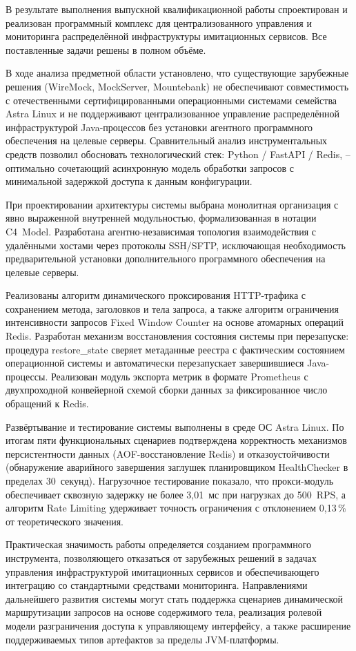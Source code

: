 ﻿\Conclusion %

В результате выполнения выпускной квалификационной работы спроектирован и реализован программный комплекс для централизованного управления и мониторинга распределённой инфраструктуры имитационных сервисов. Все поставленные задачи решены в полном объёме.

В ходе анализа предметной области установлено, что существующие зарубежные решения (WireMock, MockServer, Mountebank) не обеспечивают совместимость с отечественными сертифицированными операционными системами семейства Astra Linux и не поддерживают централизованное управление распределённой инфраструктурой Java-процессов без установки агентного программного обеспечения на целевые серверы. Сравнительный анализ инструментальных средств позволил обосновать технологический стек: Python / FastAPI / Redis, -- оптимально сочетающий асинхронную модель обработки запросов с минимальной задержкой доступа к данным конфигурации.

При проектировании архитектуры системы выбрана монолитная организация с явно выраженной внутренней модульностью, формализованная в нотации C4~Model. Разработана агентно-независимая топология взаимодействия с удалёнными хостами через протоколы SSH/SFTP, исключающая необходимость предварительной установки дополнительного программного обеспечения на целевые серверы.

Реализованы алгоритм динамического проксирования HTTP-трафика с сохранением метода, заголовков и тела запроса, а также алгоритм ограничения интенсивности запросов Fixed Window Counter на основе атомарных операций Redis. Разработан механизм восстановления состояния системы при перезапуске: процедура restore\_state сверяет метаданные реестра с фактическим состоянием операционной системы и автоматически перезапускает завершившиеся Java-процессы. Реализован модуль экспорта метрик в формате Prometheus с двухпроходной конвейерной схемой сборки данных за фиксированное число обращений к Redis.

Развёртывание и тестирование системы выполнены в среде ОС Astra Linux. По итогам пяти функциональных сценариев подтверждена корректность механизмов персистентности данных (AOF-восстановление Redis) и отказоустойчивости (обнаружение аварийного завершения заглушек планировщиком HealthChecker в пределах 30~секунд). Нагрузочное тестирование показало, что прокси-модуль обеспечивает сквозную задержку не более 3,01~мс при нагрузках до 500~RPS, а алгоритм Rate Limiting удерживает точность ограничения с отклонением 0,13\,\% от теоретического значения.

Практическая значимость работы определяется созданием программного инструмента, позволяющего отказаться от зарубежных решений в задачах управления инфраструктурой имитационных сервисов и обеспечивающего интеграцию со стандартными средствами мониторинга. Направлениями дальнейшего развития системы могут стать поддержка сценариев динамической маршрутизации запросов на основе содержимого тела, реализация ролевой модели разграничения доступа к управляющему интерфейсу, а также расширение поддерживаемых типов артефактов за пределы JVM-платформы.